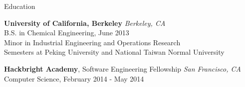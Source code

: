 \documentclass{resume} %
\begin{document}
\begin{rSection}{Education}

{\bf University of California, Berkeley} \hfill {\em Berkeley, CA} \\
B.S. in Chemical Engineering, June 2013 \\
Minor in Industrial Engineering and Operations Research \\
Semesters at Peking University and National Taiwan Normal University \smallskip


{\bf Hackbright Academy}, Software Engineering Fellowship \hfill {\em San Francisco, CA} \\
Computer Science, February 2014 - May 2014 \smallskip


\end{rSection}






\end{document}
